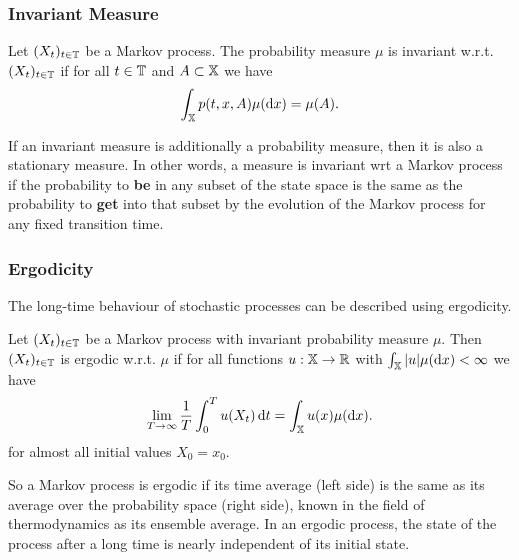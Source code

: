 \subsubsection*{Invariant Measure}

\begin{defi}
Let $(X_t)_{t\in\mathbb{T}}$ be a Markov process. The probability measure $\mu$ is invariant w.r.t. $(X_t)_{t\in\mathbb{T}}$ if for all $t\in\mathbb{T}$ and $A \subset \mathbb{X}$ we have
\begin{equation}
\int_{\mathbb{X}} p(t,x,A) \mu(\mathop{}\!\mathrm{d} x) = \mu(A).
\end{equation}
\end{defi}
If an invariant measure is additionally a probability measure, then it is also a stationary measure. 
In other words, a measure is invariant wrt a Markov process if the probability to \textbf{be} in any subset of the state space is the same as the probability to \textbf{get} into that subset by the evolution of the Markov process for any fixed transition time.

\subsubsection*{Ergodicity}
The long-time behaviour of stochastic processes can be described using ergodicity.
\begin{defi}
Let $(X_t)_{t\in\mathbb{T}}$ be a Markov process with invariant probability measure $\mu$. Then $(X_t)_{t\in\mathbb{T}}$ is ergodic w.r.t. $\mu$ if for all functions $u: \mathbb{X} \rightarrow \mathbb{R}$ with $\int_{\mathbb{X}} |u| \mu(\mathop{}\!\mathrm{d} x) < \infty$
we have
\begin{equation}
\lim_{T \rightarrow \infty} \frac{1}{T} \int_0^T u(X_t) \mathop{}\!\mathrm{d} t = \int_{\mathbb{X}} u(x) \mu(\mathop{}\!\mathrm{d} x).
\end{equation}
for almost all initial values $X_0=x_0$.
\end{defi}
So a Markov process is ergodic if its time average (left side) is the same as its average over the probability space (right side), known in the field of thermodynamics as its ensemble average. In an ergodic process, the state of the process after a long time is nearly independent of its initial state.

